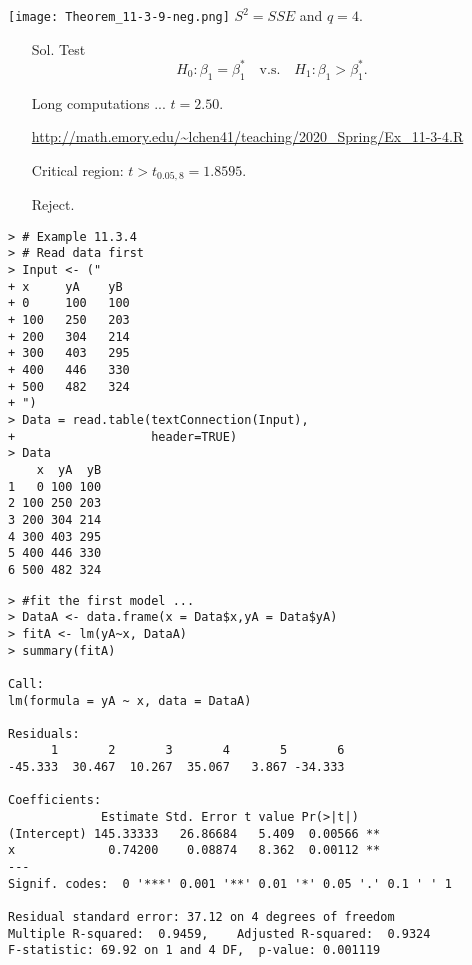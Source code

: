 \begin{frame}
	\centering
	\texttt{[image: Theorem\_11-3-9-neg.png]}
\vfill \pause
$S^2 = SSE$ and $q = 4$.
\end{frame}
\begin{frame}

	\begin{enumerate}
		\item[Sol.] Test
			\[
				H_0: \beta_1 = \beta_1^* \quad\text{v.s.}\quad
				H_1: \beta_1 > \beta_1^*.
			\]
			\vfill
		\item[] Long computations  ... $t = 2.50$.
			\begin{center}
				\url{http://math.emory.edu/~lchen41/teaching/2020_Spring/Ex_11-3-4.R}
			\end{center}
			\vfill
		\item[] Critical region: $t>t_{0.05,8} = 1.8595$.
			\vfill
		\item[] Reject. \myEnd
	\end{enumerate}
\end{frame}
\begin{frame}[fragile]
	\begin{center}
\begin{lstlisting}
> # Example 11.3.4
> # Read data first
> Input <- ("
+ x     yA    yB
+ 0     100   100
+ 100   250   203
+ 200   304   214
+ 300   403   295
+ 400   446   330
+ 500   482   324
+ ")
> Data = read.table(textConnection(Input),
+                   header=TRUE)
> Data
    x  yA  yB
1   0 100 100
2 100 250 203
3 200 304 214
4 300 403 295
5 400 446 330
6 500 482 324
\end{lstlisting}
	\end{center}
\end{frame}
\begin{frame}[fragile]
\begin{lstlisting}
> #fit the first model ...
> DataA <- data.frame(x = Data$x,yA = Data$yA)
> fitA <- lm(yA~x, DataA)
> summary(fitA)

Call:
lm(formula = yA ~ x, data = DataA)

Residuals:
      1       2       3       4       5       6
-45.333  30.467  10.267  35.067   3.867 -34.333

Coefficients:
             Estimate Std. Error t value Pr(>|t|)
(Intercept) 145.33333   26.86684   5.409  0.00566 **
x             0.74200    0.08874   8.362  0.00112 **
---
Signif. codes:  0 '***' 0.001 '**' 0.01 '*' 0.05 '.' 0.1 ' ' 1

Residual standard error: 37.12 on 4 degrees of freedom
Multiple R-squared:  0.9459,	Adjusted R-squared:  0.9324
F-statistic: 69.92 on 1 and 4 DF,  p-value: 0.001119
\end{lstlisting}
\end{frame}
